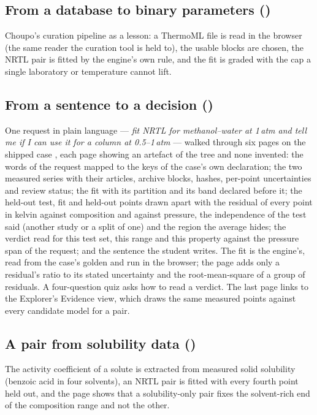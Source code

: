 \documentclass[11pt,a4paper]{article}
\begin{document}
\subsection*{From a database to binary parameters \quad()}
Choupo's curation pipeline as a lesson: a ThermoML file is read in the
browser (the same reader the curation tool is held to), the usable blocks
are chosen, the NRTL pair is fitted by the engine's own rule, and the fit is
graded with the cap a single laboratory or temperature cannot lift.

\subsection*{From a sentence to a decision \quad()}
One request in plain language --- \emph{fit NRTL for methanol--water at 1\,atm
and tell me if I can use it for a column at 0.5--1\,atm} --- walked through six
pages on the shipped case , each page
showing an artefact of the tree and none invented: the words of the request
mapped to the keys of the case's own declaration; the two measured series with
their articles, archive blocks, hashes, per-point uncertainties and review
status; the fit with its partition and its band declared before it; the
held-out test, fit and held-out points drawn apart with the residual of every
point in kelvin against composition and against pressure, the independence of
the test said (another study or a split of one) and the region the average
hides; the verdict read for this test set, this range and this property
against the pressure span of the request; and the sentence the student writes.
The fit is the engine's, read from the case's golden and run in the browser;
the page adds only a residual's ratio to its stated uncertainty and the
root-mean-square of a group of residuals.  A four-question quiz asks how to
read a verdict.  The last page links to the Explorer's Evidence view, which draws the same
measured points against every candidate model for a pair.

\subsection*{A pair from solubility data \quad()}
The activity coefficient of a solute is extracted from measured solid
solubility (benzoic acid in four solvents), an NRTL pair is fitted with
every fourth point held out, and the page shows that a solubility-only pair
fixes the solvent-rich end of the composition range and not the other.
\end{document}
